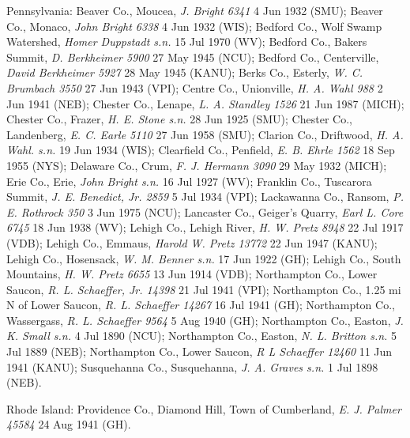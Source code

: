 \documentclass{article}
\begin{document}
Pennsylvania:
Beaver Co., Moucea, \textit{J. Bright 6341} 4 Jun 1932 (SMU);
Beaver Co., Monaco, \textit{John Bright 6338} 4 Jun 1932 (WIS);
Bedford Co., Wolf Swamp Watershed, \textit{Homer Duppstadt s.n.} 15 Jul 1970 (WV);
Bedford Co., Bakers Summit, \textit{D. Berkheimer 5900} 27 May 1945 (NCU);
Bedford Co., Centerville, \textit{David Berkheimer 5927} 28 May 1945 (KANU);
Berks Co., Esterly, \textit{W. C. Brumbach 3550} 27 Jun 1943 (VPI);
Centre Co., Unionville, \textit{H. A. Wahl 988} 2 Jun 1941 (NEB);
Chester Co., Lenape, \textit{L. A. Standley 1526} 21 Jun 1987 (MICH);
Chester Co., Frazer, \textit{H. E. Stone s.n.} 28 Jun 1925 (SMU);
Chester Co., Landenberg, \textit{E. C. Earle 5110} 27 Jun 1958 (SMU);
Clarion Co., Driftwood, \textit{H. A. Wahl. s.n.} 19 Jun 1934 (WIS);
Clearfield Co., Penfield, \textit{E. B. Ehrle 1562} 18 Sep 1955 (NYS);
Delaware Co.,  Crum, \textit{F. J. Hermann 3090} 29 May 1932 (MICH);
Erie Co., Erie, \textit{John Bright s.n.} 16 Jul 1927 (WV);
Franklin Co., Tuscarora Summit, \textit{J. E. Benedict, Jr. 2859} 5 Jul 1934 (VPI);
Lackawanna Co., Ransom, \textit{P. E. Rothrock 350} 3 Jun 1975 (NCU);
Lancaster Co., Geiger's Quarry, \textit{Earl L. Core 6745} 18 Jun 1938 (WV);
Lehigh Co., Lehigh River, \textit{H. W. Pretz 8948} 22 Jul 1917 (VDB);
Lehigh Co., Emmaus, \textit{Harold W. Pretz 13772} 22 Jun 1947 (KANU);
Lehigh Co., Hosensack, \textit{W. M. Benner s.n.} 17 Jun 1922 (GH);
Lehigh Co., South Mountains, \textit{H. W. Pretz 6655} 13 Jun 1914 (VDB);
Northampton Co., Lower Saucon, \textit{R. L. Schaeffer, Jr. 14398} 21 Jul 1941 (VPI);
Northampton Co., 1.25 mi N of Lower Saucon, \textit{R. L. Schaeffer 14267} 16 Jul 1941 (GH);
Northampton Co., Wassergass, \textit{R. L. Schaeffer 9564} 5 Aug 1940 (GH);
Northampton Co., Easton, \textit{J. K. Small s.n.} 4 Jul 1890 (NCU);
Northampton Co., Easton, \textit{N. L. Britton s.n.} 5 Jul 1889 (NEB);
Northampton Co., Lower Saucon, \textit{R L Schaeffer 12460} 11 Jun 1941 (KANU);
Susquehanna Co., Susquehanna, \textit{J. A. Graves s.n.} 1 Jul 1898 (NEB).

Rhode Island:
Providence Co., Diamond Hill, Town of Cumberland, \textit{E. J. Palmer 45584} 24 Aug 1941 (GH).
\end{document}
